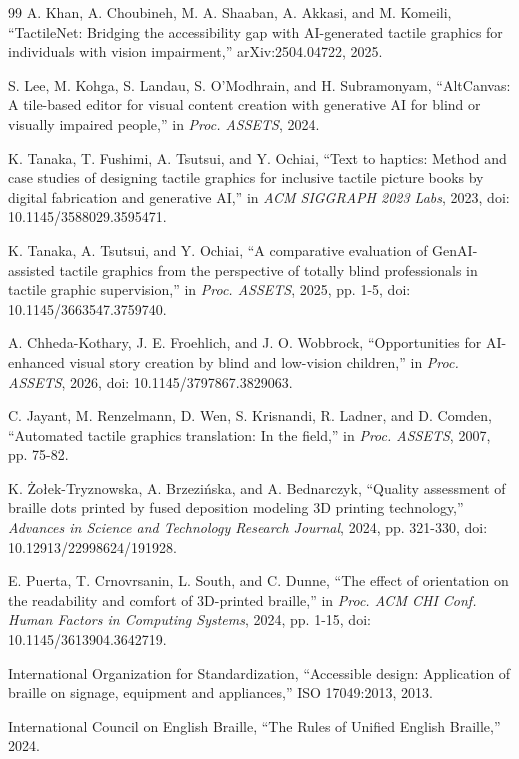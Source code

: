 \documentclass[conference]{IEEEtran}
\begin{document}
\begin{thebibliography}{99}
 A. Khan, A. Choubineh, M. A. Shaaban, A. Akkasi, and M. Komeili, ``TactileNet: Bridging the accessibility gap with AI-generated tactile graphics for individuals with vision impairment,'' arXiv:2504.04722, 2025.

 S. Lee, M. Kohga, S. Landau, S. O'Modhrain, and H. Subramonyam, ``AltCanvas: A tile-based editor for visual content creation with generative AI for blind or visually impaired people,'' in \emph{Proc. ASSETS}, 2024.

 K. Tanaka, T. Fushimi, A. Tsutsui, and Y. Ochiai, ``Text to haptics: Method and case studies of designing tactile graphics for inclusive tactile picture books by digital fabrication and generative AI,'' in \emph{ACM SIGGRAPH 2023 Labs}, 2023, doi: 10.1145/3588029.3595471.

 K. Tanaka, A. Tsutsui, and Y. Ochiai, ``A comparative evaluation of GenAI-assisted tactile graphics from the perspective of totally blind professionals in tactile graphic supervision,'' in \emph{Proc. ASSETS}, 2025, pp. 1-5, doi: 10.1145/3663547.3759740.

 A. Chheda-Kothary, J. E. Froehlich, and J. O. Wobbrock, ``Opportunities for AI-enhanced visual story creation by blind and low-vision children,'' in \emph{Proc. ASSETS}, 2026, doi: 10.1145/3797867.3829063.

 C. Jayant, M. Renzelmann, D. Wen, S. Krisnandi, R. Ladner, and D. Comden, ``Automated tactile graphics translation: In the field,'' in \emph{Proc. ASSETS}, 2007, pp. 75-82.

 K. Żołek-Tryznowska, A. Brzezińska, and A. Bednarczyk, ``Quality assessment of braille dots printed by fused deposition modeling 3D printing technology,'' \emph{Advances in Science and Technology Research Journal}, 2024, pp. 321-330, doi: 10.12913/22998624/191928.

 E. Puerta, T. Crnovrsanin, L. South, and C. Dunne, ``The effect of orientation on the readability and comfort of 3D-printed braille,'' in \emph{Proc. ACM CHI Conf. Human Factors in Computing Systems}, 2024, pp. 1-15, doi: 10.1145/3613904.3642719.

 International Organization for Standardization, ``Accessible design: Application of braille on signage, equipment and appliances,'' ISO 17049:2013, 2013.

 International Council on English Braille, ``The Rules of Unified English Braille,'' 2024.


\end{thebibliography}
\end{document}
